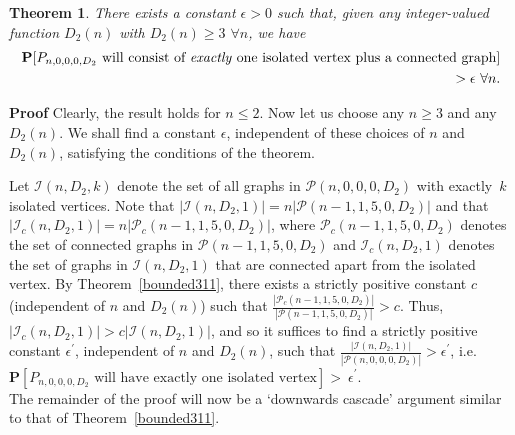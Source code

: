 \documentclass{article}
\newtheorem{Theorem}{Theorem}
\newtheorem{Proof of Theorem}{Proof of Theorem}
\begin{document}
\begin{Theorem} \label{bounded807}
There exists a constant $\epsilon>0$ such that,
given any integer-valued function $D_{2}(n)$ with $D_{2}(n) \geq 3$ $\forall n$,
we have
\begin{eqnarray*}
\mathbf{P}[P_{n,0,0,0,D_{2}} 
\textrm{ will consist of \emph{exactly} one isolated vertex plus a connected graph}] \\
> \epsilon 
\textrm{ } \forall n.
\end{eqnarray*}
\end{Theorem}
\textbf{Proof}
Clearly,
the result holds for $n \leq 2$.
Now let us choose any $n \geq 3$ and any $D_{2}(n)$.
We shall find a constant $\epsilon$,
independent of these choices of $n$ and $D_{2}(n)$,
satisfying the conditions of the theorem.

Let $\mathcal{I}(n,D_{2},k)$ denote the set of all graphs in $\mathcal{P}(n,0,0,0,D_{2})$
with exactly~$k$ isolated vertices.
Note that 
$|\mathcal{I}(n,D_{2},1)| = n|\mathcal{P}(n-1,1,5,0,D_{2})|$
and that 
$|\mathcal{I}_{c}(n,D_{2},1)| = n|\mathcal{P}_{c}(n-1,1,5,0,D_{2})|$,
where $\mathcal{P}_{c}(n-1,1,5,0,D_{2})$ denotes the set of connected graphs in $\mathcal{P}(n-1,1,5,0,D_{2})$
and $\mathcal{I}_{c}(n,D_{2},1)$ denotes the set of graphs in $\mathcal{I}(n,D_{2},1)$
that are connected apart from the isolated vertex.
By Theorem~\ref{bounded311},
there exists a strictly positive constant $c$
(independent of $n$ and $D_{2}(n)$)
such that
$\frac{ |\mathcal{P}_{c}(n-1,1,5,0,D_{2})| }{ |\mathcal{P}(n-1,1,5,0,D_{2})| } \!>\! c$.
Thus, $|\mathcal{I}_{c}(n,D_{2},1)| \!>\! c |\mathcal{I}(n,D_{2},1)|$,
and so it suffices to find a strictly positive constant $\epsilon^{\prime}$,
independent of $n$ and $D_{2}(n)$,
such that
$\frac{ |\mathcal{I}(n,D_{2},1)| }{ |\mathcal{P}(n,0,0,0,D_{2})| } \!>\! \epsilon^{\prime}$,
i.e.~$\mathbf{P}[P_{n,0,0,0,D_{2}} \textrm{ will have exactly one isolated vertex}] \!>~\!\!\epsilon^{\prime}$. \\

The remainder of the proof 
will now be a `downwards cascade' argument similar to that of Theorem~\ref{bounded311}. 
\end{document}
